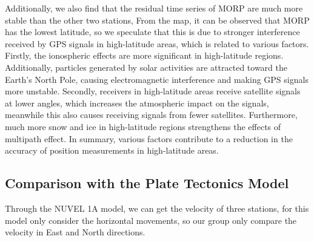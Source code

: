 \documentclass{article}
\begin{document}
Additionally, we also find that the residual time series of MORP are much more stable than the other two stations, 
From the map, it can be observed that MORP has the lowest latitude, so we speculate that this is due to stronger interference received by GPS signals in high-latitude areas, which is related to various factors. 
Firstly, the ionospheric effects are more significant in high-latitude regions. 
Additionally, particles generated by solar activities are attracted toward the Earth's North Pole, causing electromagnetic interference and making GPS signals more unstable. 
Secondly, receivers in high-latitude areas receive satellite signals at lower angles, which increases the atmospheric impact on the signals, meanwhile this also causes receiving signals from fewer satellites. 
Furthermore, much more snow and ice in high-latitude regions strengthens the effects of multipath effect. 
In summary, various factors contribute to a reduction in the accuracy of position measurements in high-latitude areas.


\subsection{Comparison with the Plate Tectonics Model}
Through the NUVEL 1A model, we can get the velocity of three stations, for this model only consider the horizontal movements,
so our group only compare the velocity in East and North directions. 
\end{document}
